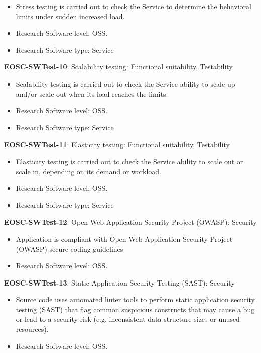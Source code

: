 \begin{itemize}
    \item Stress testing is carried out to check the Service to determine the behavioral limits under sudden increased load.~\cite{orviz_fernandez_eosc-synergy_2020}
    \item Research Software level: OSS.
    \item Research Software type: Service
\end{itemize}

\textbf{EOSC-SWTest-10}: Scalability testing: Functional suitability, Testability

\begin{itemize}
    \item Scalability testing is carried out to check the Service ability to scale up and/or scale out when its load reaches the limits.~\cite{orviz_fernandez_eosc-synergy_2020}
    \item Research Software level: OSS.
    \item Research Software type: Service
\end{itemize}

\textbf{EOSC-SWTest-11}: Elasticity testing: Functional suitability, Testability

\begin{itemize}
    \item Elasticity testing is carried out to check the Service ability to scale out or scale in, depending on its demand or workload.~\cite{orviz_fernandez_eosc-synergy_2020}
    \item Research Software level: OSS.
    \item Research Software type: Service
\end{itemize}

\textbf{EOSC-SWTest-12}: Open Web Application Security Project (OWASP): Security

\begin{itemize}
    \item Application is compliant with Open Web Application Security Project (OWASP) secure coding guidelines~\cite{orviz_set_2017}
    \item Research Software level: OSS.
\end{itemize}

\textbf{EOSC-SWTest-13}: Static Application Security Testing (SAST): Security

\begin{itemize}
    \item Source code uses automated linter tools to perform static application security testing (SAST) that flag common suspicious constructs that may cause a bug or lead to a security risk (e.g. inconsistent data structure sizes or unused resources).~\cite{orviz_set_2017}
    \item Research Software level: OSS.
\end{itemize}

